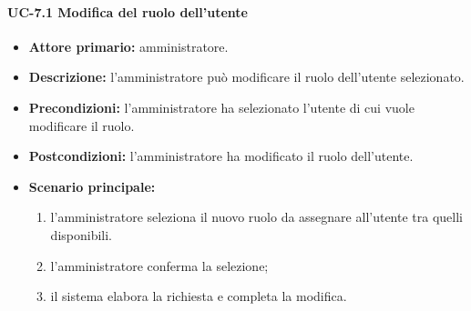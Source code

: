     \paragraph{UC-7.1 Modifica del ruolo dell'utente}
    \begin{itemize}
        \item \textbf{Attore primario:} amministratore.
    
        \item \textbf{Descrizione:} l'amministratore può modificare il ruolo dell'utente selezionato.
        
        \item \textbf{Precondizioni:} l'amministratore ha selezionato l'utente di cui vuole modificare il ruolo.
    
        \item \textbf{Postcondizioni:} l'amministratore ha modificato il ruolo dell'utente.
    
        \item \textbf{Scenario principale:}
        \begin{enumerate}
            \item  l'amministratore seleziona il nuovo ruolo da assegnare all'utente tra quelli disponibili.
            \item l'amministratore conferma la selezione;
            \item il sistema elabora la richiesta e completa la modifica.
        \end{enumerate}
    \end{itemize}
    
